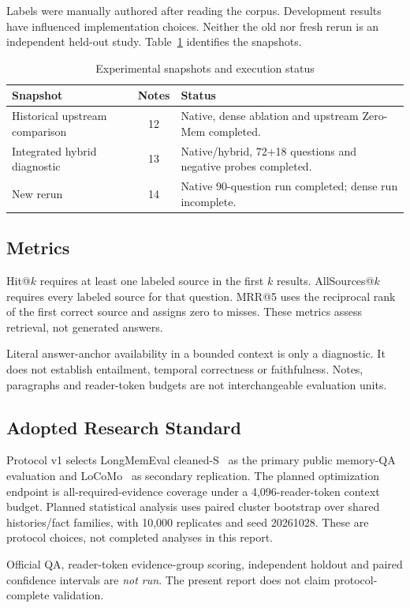 \documentclass[conference]{IEEEtran}
\begin{document}
Labels were manually authored after reading the corpus. Development results have influenced implementation choices. Neither the old nor fresh rerun is an independent held-out study. Table~\ref{tab:snapshots} identifies the snapshots.
\begin{table}[t]
\caption{Experimental snapshots and execution status}
\label{tab:snapshots}
\centering\small
\begin{tabularx}{\columnwidth}{@{}lcX@{}}
\toprule
Snapshot & Notes & Status \\
\midrule
Historical upstream comparison & 12 & Native, dense ablation and upstream Zero-Mem completed. \\
Integrated hybrid diagnostic & 13 & Native/hybrid, 72+18 questions and negative probes completed. \\
New rerun & 14 & Native 90-question run completed; dense run incomplete. \\
\bottomrule
\end{tabularx}
\end{table}

\subsection{Metrics}
Hit@$k$ requires at least one labeled source in the first $k$ results. AllSources@$k$ requires every labeled source for that question. MRR@5 uses the reciprocal rank of the first correct source and assigns zero to misses. These metrics assess retrieval, not generated answers.

Literal answer-anchor availability in a bounded context is only a diagnostic. It does not establish entailment, temporal correctness or faithfulness. Notes, paragraphs and reader-token budgets are not interchangeable evaluation units.

\subsection{Adopted Research Standard}
Protocol v1 selects LongMemEval cleaned-S~\cite{longmem} as the primary public memory-QA evaluation and LoCoMo~\cite{locomo} as secondary replication. The planned optimization endpoint is all-required-evidence coverage under a 4,096-reader-token context budget. Planned statistical analysis uses paired cluster bootstrap over shared histories/fact families, with 10,000 replicates and seed 20261028. These are protocol choices, not completed analyses in this report.

Official QA, reader-token evidence-group scoring, independent holdout and paired confidence intervals are \emph{not run}. The present report does not claim protocol-complete validation.
\end{document}
